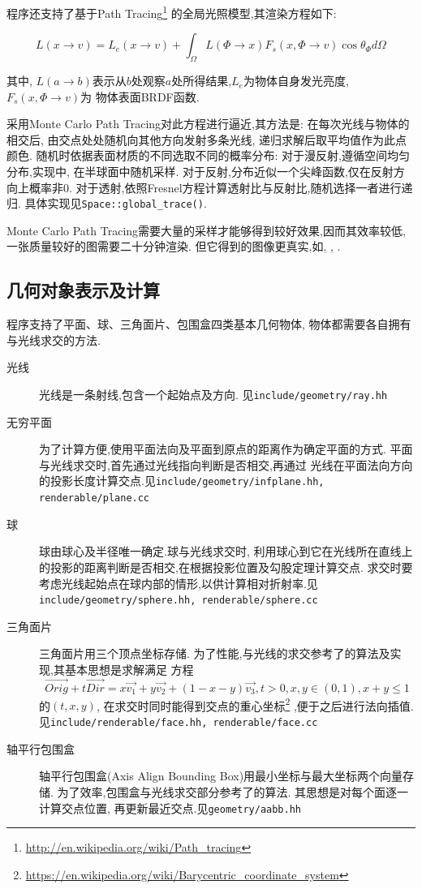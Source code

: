 程序还支持了基于Path Tracing\footnote{\url{http://en.wikipedia.org/wiki/Path_tracing}}
的全局光照模型,其渲染方程如下:

\[ L(x \rightarrow v) = L_e(x \rightarrow v)
+ \int_{\Omega}L(\Phi \rightarrow x) F_s(x, \Phi \rightarrow v)\cos \theta_{\Phi} d \Omega\]

其中, $ L(a\rightarrow b)$表示从$ b$处观察$ a$处所得结果,$ L_e$为物体自身发光亮度,$ F_s(x, \Phi \rightarrow v)$为
物体表面BRDF函数.

采用Monte Carlo Path Tracing\cite{montecarlo}对此方程进行逼近,其方法是:
在每次光线与物体的相交后, 由交点处处随机向其他方向发射多条光线, 递归求解后取平均值作为此点颜色.
随机时依据表面材质的不同选取不同的概率分布:
对于漫反射,遵循空间均匀分布,实现中, 在半球面中随机采样.
对于反射,分布近似一个尖峰函数,仅在反射方向上概率非0.
对于透射,依照Fresnel方程\cite{fresnel}计算透射比与反射比,随机选择一者进行递归.
具体实现见\verb|Space::global_trace()|.

Monte Carlo Path Tracing需要大量的采样才能够得到较好效果,因而其效率较低,
一张质量较好的图需要二十分钟渲染. 但它得到的图像更真实,如, , .

\subsection{几何对象表示及计算}
程序支持了平面、球、三角面片、包围盒四类基本几何物体,
物体都需要各自拥有与光线求交的方法.

\begin{description}
  \item[光线]光线是一条射线,包含一个起始点及方向. 见\verb|include/geometry/ray.hh|
  \item[无穷平面]
    为了计算方便,使用平面法向及平面到原点的距离作为确定平面的方式.
    平面与光线求交时,首先通过光线指向判断是否相交,再通过
    光线在平面法向方向的投影长度计算交点.见\verb|include/geometry/infplane.hh, renderable/plane.cc|

  \item[球]球由球心及半径唯一确定.球与光线求交时,
    利用球心到它在光线所在直线上的投影的距离判断是否相交,在根据投影位置及勾股定理计算交点.
    求交时要考虑光线起始点在球内部的情形,以供计算相对折射率.见\verb|include/geometry/sphere.hh, renderable/sphere.cc|

  \item[三角面片]三角面片用三个顶点坐标存储.
    为了性能,与光线的求交参考了\cite{triangle, triangle_code}的算法及实现,其基本思想是求解满足
    方程
    \[  \overrightarrow{Orig} + t  \overrightarrow{Dir} = x \overrightarrow{v_1} + y  \overrightarrow{v_2} + (1 - x -
      y)\overrightarrow{v_3}, t > 0, x, y \in (0, 1), x + y \le 1\]
    的$ (t, x, y)$, 在求交时同时能得到交点的重心坐标\footnote{\url{https://en.wikipedia.org/wiki/Barycentric\_coordinate\_system}}
    ,便于之后进行法向插值.见\verb|include/renderable/face.hh, renderable/face.cc|

  \item[轴平行包围盒]
    轴平行包围盒(Axis Align Bounding Box)用最小坐标与最大坐标两个向量存储.
    为了效率,包围盒与光线求交部分参考了\cite{aabb}的算法.
    其思想是对每个面逐一计算交点位置, 再更新最近交点.见\verb|geometry/aabb.hh|
\end{description}


